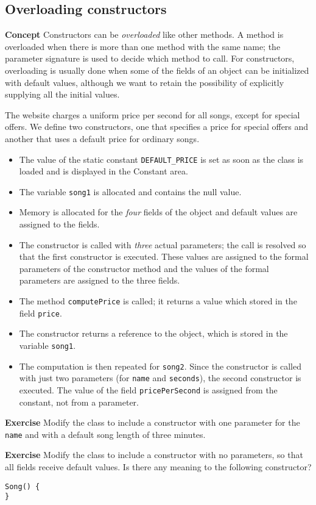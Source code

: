\subsection{Overloading constructors}\label{con.03}

\textbf{Concept} Constructors can be \emph{overloaded} like other methods. A method is overloaded when there is more than one method with the same name; the parameter signature is used to decide which method to call. For constructors, overloading is usually done when some of the fields of an object can be initialized with default values, although we want to retain 
the possibility of explicitly supplying all the initial values.


The website charges a uniform price per second for all songs, except for special offers. We define two constructors, one that specifies a price for special offers and another that uses a default price for ordinary songs.
\begin{itemize}
\item The value of the static constant \texttt{DEFAULT\_PRICE} is set as soon as the class is loaded and is displayed in the Constant area.
\item The variable \texttt{song1} is allocated and contains the null value.
\item Memory is allocated for the \emph{four} fields of the object and default values are assigned to the fields. 
\item The constructor is called with \emph{three} actual parameters; the call is resolved so that the first constructor is executed. These values are assigned to the formal parameters of the constructor method and the values of the formal parameters are assigned to the three fields. 
\item The method \texttt{computePrice} is called; it returns a value which stored in the field \texttt{price}.
\item The constructor returns a reference to the object, which is stored in the variable \texttt{song1}.
\item The computation is then repeated for \texttt{song2}.
Since the constructor is called with just two parameters (for \texttt{name} and \texttt{seconds}),
the second constructor is executed. 
The value of the field \texttt{pricePerSecond} is assigned from the constant, not from a parameter.
\end{itemize}

\textbf{Exercise} Modify the class to include a constructor with one parameter for the \texttt{name} and with a default song length of three minutes.

\textbf{Exercise} Modify the class to include a constructor with no parameters, so that all fields receive default values. Is there any meaning to the following constructor?

\hspace*{3em}\texttt{Song() \{}\\
\hspace*{3em}\texttt{\}}
